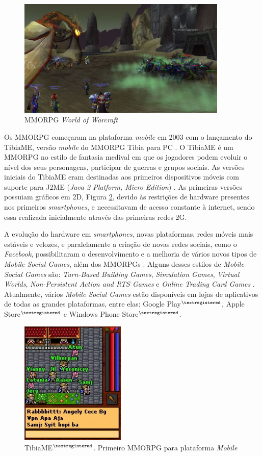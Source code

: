 \begin{figure}[h]
  \centering
  \includegraphics[width=10cm]{figuras/wow.jpg}
  \caption{MMORPG \textit{World of Warcraft} \cite{kotaku}}
  \label{figura:wow}
\end{figure}

Os MMORPG começaram na plataforma \textit{mobile} em 2003 com o lançamento do
TibiaME, versão \textit{mobile} do MMORPG Tibia para PC \cite{tibiaME}. O
TibiaME é um MMORPG no estilo de fantasia medival em que os jogadores podem
evoluir o nível dos seus personagens, participar de guerras e grupos sociais.
As versões iniciais do TibiaME eram destinadas aos primeiros dispositivos
móveis com suporte para J2ME (\textit{Java 2 Platform, Micro Edition})
\cite{tibiaMEhistory}. As primeiras versões possuiam gráficos em 2D, Figura
\ref{figura:tibiaME}, devido às restrições de hardware presentes nos primeiros
\textit{smartphones}, e necessitavam de acesso constante à internet, sendo
essa realizada inicialmente através das primeiras redes 2G.

A evolução do hardware em \textit{smartphones}, novas plataformas, redes
móveis mais estáveis e velozes, e paralelamente a criação de novas redes
sociais, como o \textit{Facebook}, possibilitaram o desenvolvimento e a
melhoria de vários novos tipos de \textit{Mobile Social Games}, além dos
MMORPGs \cite{fields2014}. Alguns desses estilos de \textit{Mobile Social
Games} são: \textit{Turn-Based Building Games}, \textit{Simulation Games},
\textit{Virtual Worlds}, \textit{Non-Persistent Action and RTS Games} e
\textit{Online Trading Card Games} \cite{fields2014}. Atualmente, vários
\textit{Mobile Social Games} estão disponíveis em lojas de aplicativos de
todas as grandes plataformas, entre elas: Google Play$^{\tiny{®}}$, Apple
Store$^{\tiny{®}}$ e Windows Phone Store$^{\tiny{®}}$.

\begin{figure}[h]
  \centering
  \includegraphics[width=5cm]{figuras/tibiaME}
  \caption{TibiaME$^{\tiny{®}}$. Primeiro MMORPG para plataforma \textit{Mobile} \cite{tibiaMEhistory}}
  \label{figura:tibiaME}
\end{figure}

